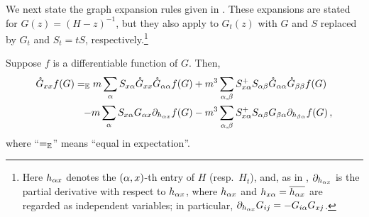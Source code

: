 

We next state the graph expansion rules given in \cite{yang2021delocalization}. These expansions are stated for $G(z)=(H-z)^{-1}$, but they also apply to $G_t(z)$ with $G$ and $S$ replaced by $G_t$ and $S_t=tS$, respectively.\footnote{Here $h_{\alpha x}$ denotes the $(\alpha,x)$-th entry of $H$ (resp.~$H_t$), and, as in \cite{yang2021delocalization}, $\partial_{h_{\alpha x}}$ is the partial derivative with respect to $h_{\alpha x}$, where $h_{\alpha x}$ and $h_{x\alpha}=\overline{h_{\alpha x}}$ are regarded as independent variables; in particular, $\partial_{h_{\alpha x}}G_{ij}=-G_{i\alpha}G_{xj}$.}


\begin{lemma} \label{ssl} %
Suppose $f$ is a differentiable function of $G$. Then,
\begin{align} 
 {\mathring G}_{xx}  f(G)=_{\mathbb{E}}  m \sum_{  \alpha} S_{x\alpha}  {\mathring G}_{xx}{\mathring G}_{\alpha\alpha} f (G)  &+m^3 \sum_{  \alpha,\beta}S^{+}_{x\alpha} S_{\alpha \beta}  {\mathring G}_{\alpha\alpha}{\mathring G}_{\beta\beta} f (G) \nonumber\\
  -  m  \sum_{ \alpha} S_{x \alpha} G_{\alpha x}\partial_{ h_{ \alpha x}} f (G) &-  m^3 \sum_{ \alpha,\beta} S^{+}_{x\alpha}S_{\alpha \beta} G_{\beta \alpha}\partial_{ h_{ \beta\alpha}} f(G)  \, ,\label{Owx}\end{align}
 where ``$=_{\mathbb{E}}$'' means ``equal in expectation''. %
\end{lemma} 


